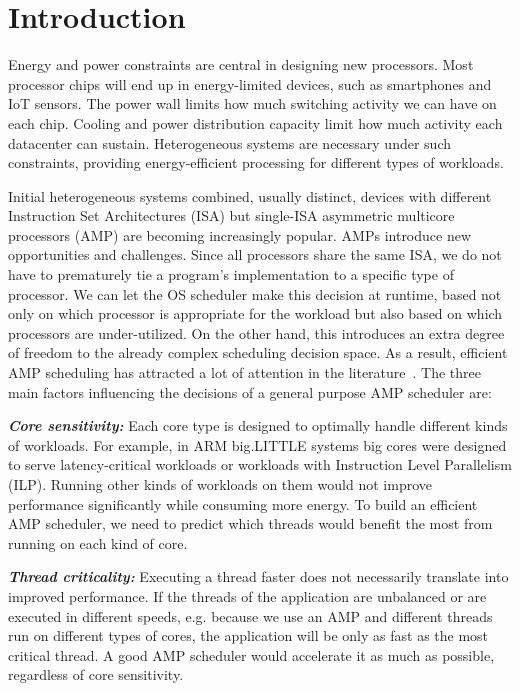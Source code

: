 \section{Introduction}
\label{itr}
Energy and power constraints are central in designing new processors. Most processor chips will end up in energy-limited devices, such as smartphones and IoT sensors. The power wall limits how much switching activity we can have on each chip. Cooling and power distribution capacity limit how much activity each datacenter can sustain. Heterogeneous systems are necessary under such constraints, providing energy-efficient processing for different types of workloads. 

Initial heterogeneous systems combined, usually distinct, devices with different Instruction Set Architectures (ISA) but single-ISA asymmetric multicore processors (AMP) are becoming increasingly popular. AMPs introduce new opportunities and challenges. Since all processors share the same ISA, we do not have to prematurely tie a program's implementation to a specific type of processor. We can let the OS scheduler make this decision at runtime, based not only on which processor is appropriate for the workload but also based on which processors are under-utilized. On the other hand, this introduces an extra degree of freedom to the already complex scheduling decision space. As a result, efficient AMP scheduling has attracted a lot of attention in the literature~\cite{mittal2016survey}. The three main factors influencing the decisions of a general purpose AMP scheduler are: 
 
\textbf{\textit{Core sensitivity:}} Each core type is designed to optimally handle different kinds of workloads. For example, in ARM big.LITTLE systems big cores were designed to serve latency-critical workloads or workloads with Instruction Level Parallelism (ILP). Running other kinds of workloads on them would not improve performance significantly while consuming more energy. To build an efficient AMP scheduler, we need to predict which threads would benefit the most from running on each kind of core.
 
\textbf{\textit{Thread criticality:}} Executing a thread faster does not necessarily translate into improved performance. If the threads of the application are unbalanced or are executed in different speeds, e.g. because we use an AMP and different threads run on different types of cores, the application will be only as fast as the most critical thread. A good AMP scheduler would accelerate it as much as possible, regardless of core sensitivity. 
 
